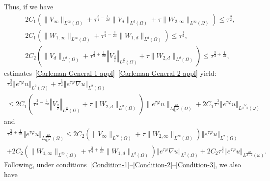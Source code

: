 \documentclass[AHL,Unicode,longabstracts]{cedram}
\newcommand{\norm}[1]{\left\Vert#1\right\Vert}
\renewcommand{\leq}{\leqslant}
\begin{document}
Thus, if we have
\begin{align}
& 2 C_1 \left(\| V_\infty \|_{L^\infty(\Omega)} + \tau^{\frac{3}{4}-\frac{1}{2d}} \| V_{d} \|_{L^d(\Omega)} + \tau \| W_{2, \infty}\|_{L^\infty(\Omega)} \right)
\leq \tau^{\frac{3}{2}},
\label{Condition-1}
\\
& 2 C_1 \left(\| W_{1,\infty} \|_{L^\infty(\Omega)} + \tau^{\frac{3}{4}-\frac{1}{2d}} \| W_{1,d} \|_{L^d(\Omega)} \right)
\leq \tau^{\frac{1}{2}},
\label{Condition-2}
\\
&2 C_2 \left(\| V_{d} \|_{L^d(\Omega)} + \tau^{\frac{3}{4}+\frac{1}{2d}} \norm{ V_{\frac{d}{2}}}_{L^{\frac{d}{2}}(\Omega)} + \tau \| W_{2, d}\|_{L^d(\Omega)} \right)
\leq \tau^{\frac{3}{4}+\frac{1}{2d}},
\label{Condition-3}
\end{align}
estimates~\eqref{Carleman-General-1-appl}--\eqref{Carleman-General-2-appl} yield:
\begin{multline*}
\tau^{\frac{3}{2}} \norm{ e^{\tau \varphi} u }_{L^2(\Omega)} +
\tau^{\frac{1}{2}} \norm{e^{\tau \varphi} \nabla u }_{L^2(\Omega)}\\
\leq 2C_1 \left(\tau^{\frac{3}{4}-\frac{1}{2d}} \norm{ V_{\frac{d}{2}}}_{L^{\frac{d}{2}}(\Omega)} + \tau \| W_{2, d}\|_{L^d(\Omega)} \right) 
\| e^{\tau \varphi} u \|_{L^{\frac{2d}{d-2}}_{\eta, \tau}(\Omega)}
+ 2C_1\tau^{\frac{3}{2}} \norm{e^{\tau \varphi} u}_{L^{\frac{2d}{d-2}} (\omega)}
\end{multline*}
and
\begin{multline*}
\tau^{\frac{3}{4}+\frac{1}{2d}} \norm{ e^{\tau \varphi} u }_{L^{\frac{2d}{d-2}}_{\eta,\tau} (\Omega)}
\leq 2C_2 \left(\| V_\infty \|_{L^\infty(\Omega)} + \tau \| W_{2, \infty}\|_{L^\infty(\Omega)} \right)
\norm{ e^{\tau \varphi} u }_{L^2(\Omega)}
\\
+ 2C_2 \left(\| W_{1,\infty} \|_{L^\infty(\Omega)} + \tau^{\frac{3}{4}+\frac{1}{2d}} \| W_{1,d} \|_{L^d(\Omega)} \right)
\norm{e^{\tau \varphi} \nabla u}_{L^2(\Omega)} + 2 C_2 \tau^{\frac{3}{2}} \norm{ e^{\tau \varphi} u}_{L^{\frac{2d}{d-2}} (\omega)}.
\end{multline*}
Following, under conditions~\eqref{Condition-1}--\eqref{Condition-2}--\eqref{Condition-3}, we also have
\end{document}

